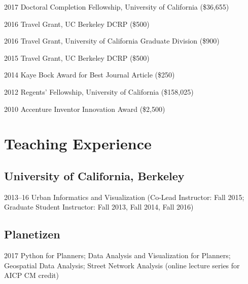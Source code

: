 \documentclass{academiccv}
\begin{document}
\begin{tablist}
	
\item[2017] \tab Doctoral Completion Fellowship, University of California (\$36,655)

\item[2016] \tab Travel Grant, UC Berkeley DCRP (\$500)

\item[2016] \tab Travel Grant, University of California Graduate Division (\$900)

\item[2015] \tab Travel Grant, UC Berkeley DCRP (\$500)

\item[2014] \tab Kaye Bock Award for Best Journal Article (\$250)

\item[2012] \tab Regents' Fellowship, University of California (\$158,025)

\item[2010] \tab Accenture Inventor Innovation Award (\$2,500)

\end{tablist}



\section*{Teaching Experience}

\subsection*{University of California, Berkeley}

\begin{tablist}
	
\item[2013--16]	\tab Urban Informatics and Visualization (Co-Lead Instructor: Fall 2015; Graduate Student Instructor: Fall 2013, Fall 2014, Fall 2016)
	
\end{tablist}

\subsection*{Planetizen}

\begin{tablist}

\item[2017]		\tab Python for Planners; Data Analysis and Visualization for Planners; Geospatial Data Analysis; Street Network Analysis (online lecture series for AICP CM credit)

\end{tablist}
\end{document}
